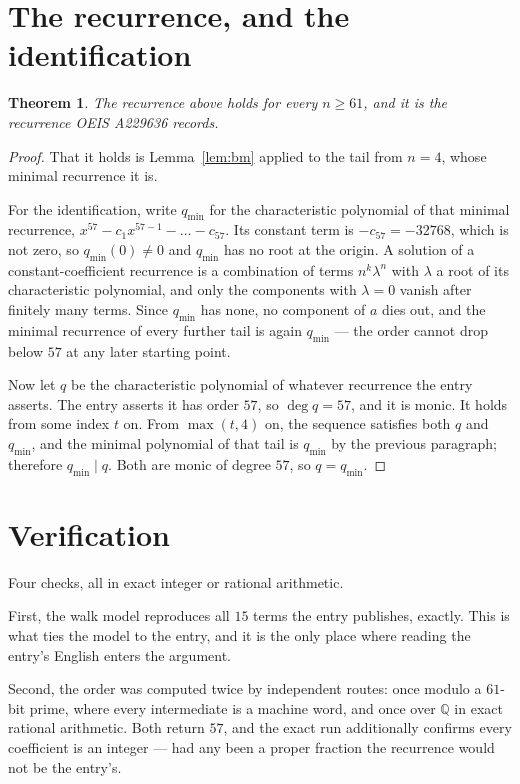 \documentclass[11pt,a4paper]{article}
\theoremstyle{plain}
\newtheorem{theorem}{Theorem}
\theoremstyle{definition}
\begin{document}
\section{The recurrence, and the identification}

\begin{theorem}
The recurrence above holds for every $n\ge61$, and it is the recurrence OEIS A229636 records.
\end{theorem}

\begin{proof}
That it holds is Lemma~\ref{lem:bm} applied to the tail from $n=4$, whose minimal
recurrence it is.

For the identification, write $q_{\min}$ for the characteristic polynomial of that minimal
recurrence, $x^{57}-c_1x^{57-1}-\dots-c_{57}$. Its constant term is
$-c_{57}=-32768$, which is not zero, so $q_{\min}(0)\neq0$ and $q_{\min}$ has no
root at the origin. A solution of a constant-coefficient recurrence is a combination of terms
$n^{k}\lambda^{n}$ with $\lambda$ a root of its characteristic polynomial, and only the
components with $\lambda=0$ vanish after finitely many terms. Since $q_{\min}$ has none, no
component of $a$ dies out, and the minimal recurrence of every further tail is again
$q_{\min}$ --- the order cannot drop below $57$ at any later starting point.

Now let $q$ be the characteristic polynomial of whatever recurrence the entry asserts. The
entry asserts it has order $57$, so $\deg q=57$, and it is monic. It holds from some
index $t$ on. From $\max(t,4)$ on, the sequence satisfies both $q$ and $q_{\min}$, and
the minimal polynomial of that tail is $q_{\min}$ by the previous paragraph; therefore
$q_{\min}\mid q$. Both are monic of degree $57$, so $q=q_{\min}$.
\end{proof}

\section{Verification}

Four checks, all in exact integer or rational arithmetic.

First, the walk model reproduces all $15$ terms the entry publishes, exactly. This is
what ties the model to the entry, and it is the only place where reading the entry's English
enters the argument.

Second, the order was computed twice by independent routes: once modulo a $61$-bit prime, where
every intermediate is a machine word, and once over $\mathbb{Q}$ in exact rational arithmetic.
Both return $57$, and the exact run additionally confirms every coefficient is an integer
--- had any been a proper fraction the recurrence would not be the entry's.
\end{document}
